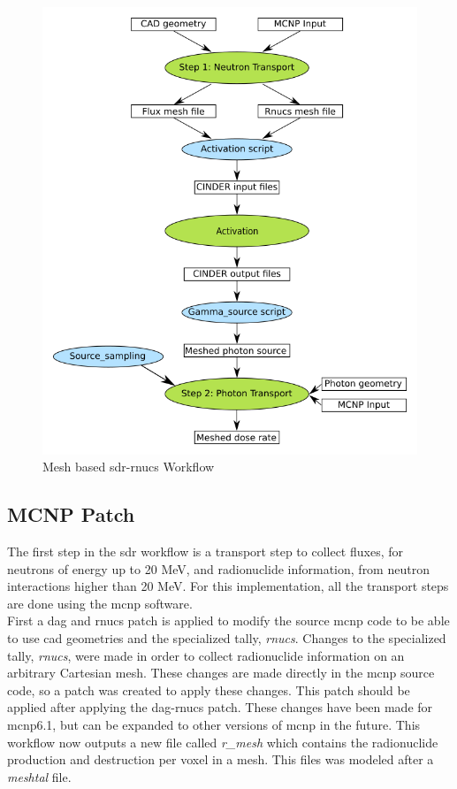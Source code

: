 \begin{figure}[H]
	\centering
	\includegraphics[scale=0.5]{../figs/rnucs_mesh.png}
	\caption{Mesh based \gls{sdr}-rnucs Workflow}
	\label{fig:mesh_rnucs}
\end{figure}
%
%
\subsection{MCNP Patch}
The first step in the \gls{sdr} workflow is a transport step to collect
fluxes, for neutrons of energy up to 20 MeV, and radionuclide information, from
neutron interactions higher than 20 MeV. For this implementation, all the
transport steps are done using the \gls{mcnp} software.\\
First a \gls{dag} and rnucs patch is applied to modify the source \gls{mcnp}
code to be able to use \gls{cad} geometries and the specialized tally,
\textit{rnucs}. Changes to the specialized tally, \textit{rnucs}, were made in
order to collect radionuclide information on an arbitrary Cartesian mesh. These
changes are made directly in the \gls{mcnp} source code, so a patch was created
to apply these changes. This patch should be applied after applying the
\gls{dag}-rnucs patch. These changes have been made for \gls{mcnp}6.1, but can
be expanded to other versions of \gls{mcnp} in the future.
This workflow now outputs a new file called \textit{r\_mesh} which contains the
radionuclide production and destruction per voxel in a mesh. This files was
modeled after a \textit{meshtal} file.
%
